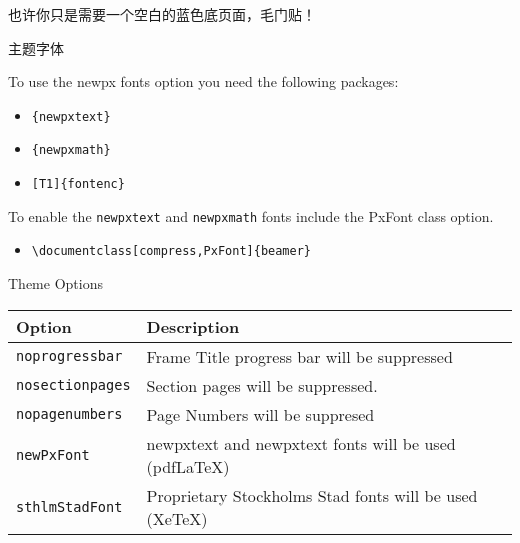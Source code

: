 \documentclass[newPxFont,sthlmFooter]{beamer}
\begin{document}
\begingroup
{}
\begin{frame}

也许你只是需要一个空白的蓝色底页面，毛门贴！
\end{frame}
\endgroup


\begin{frame}[containsverbatim]{主题字体}

To use the newpx fonts option you need the following packages:

\begin{itemize}
	\item \verb|{newpxtext}|
	\item \verb|{newpxmath}|
	\item \verb|[T1]{fontenc}|
\end{itemize}

To enable the \verb|newpxtext| and \verb|newpxmath| fonts include the \alert{PxFont} class option.\\

\begin{itemize}
	\item \verb|\documentclass[compress,PxFont]{beamer}|
\end{itemize}

\end{frame}


\begin{frame}{Theme Options}
\begin{table}[]
	\begin{tabularx}{\linewidth}{l>{\raggedright}X}
		\toprule
		\textbf{Option}			& \textbf{Description} \tabularnewline
		\midrule
		\texttt{noprogressbar} & Frame Title progress bar will be suppressed \tabularnewline
		\texttt{nosectionpages} & Section pages will be suppressed.\tabularnewline
		\texttt{nopagenumbers} & Page Numbers will be suppresed \tabularnewline
		\texttt{newPxFont} & newpxtext and newpxtext fonts will be used (pdfLaTeX) \tabularnewline
		\texttt{sthlmStadFont} & Proprietary Stockholms Stad fonts will be used (XeTeX) \tabularnewline
		\bottomrule
	\end{tabularx}
	\label{tab:options}
\end{table}
\end{frame}
\end{document}
